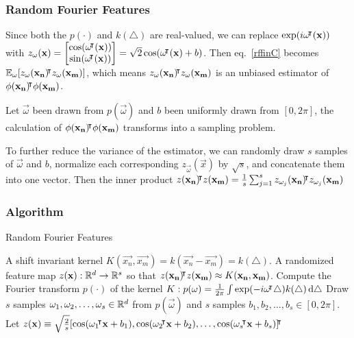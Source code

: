\documentclass[10pt]{../formats/RU}
\begin{document}
\begin{frame}
  \frametitle{Random Fourier Features}
  Since both the $p(\cdot)$ and $k(\triangle)$ are real-valued, we can replace $\exp(i\mathbf{\omega}{}^{\mkern-4mu\intercal}(\mathbf{x}))$ with
  $
  z_{\mathbf{\omega}}(\mathbf{x})=
  \begin{bmatrix}
    \cos(\mathbf{\omega}{}^{\mkern-4mu\intercal}(\mathbf{x})) \\
    \sin(\mathbf{\omega}{}^{\mkern-4mu\intercal}(\mathbf{x}))
  \end{bmatrix}
  =\sqrt{2}\cos(\mathbf{\omega}{}^{\mkern-4mu\intercal}(\mathbf{x})+b)$. Then eq.~\eqref{rffinC} becomes $\mathbb{E}_{\mathbf{\omega}}[z_{\mathbf{\omega}}(\mathbf{x_n}){}^{\mkern-4mu\intercal} z_{\mathbf{\omega}}(\mathbf{x_m})]$, which means $z_{\mathbf{\omega}}(\mathbf{x_n}){}^{\mkern-4mu\intercal} z_{\mathbf{\omega}}(\mathbf{x_m})$ is an unbiased estimator of $\phi(\mathbf{x_n}){}^{\mkern-4mu\intercal}\phi(\mathbf{x_m})$.

  Let $\vec{\omega}$ been drawn from $p(\vec{\omega})$ and $b$ been uniformly drawn from $[0, 2\pi]$, the calculation of $\phi(\mathbf{x_n}){}^{\mkern-4mu\intercal}\phi(\mathbf{x_m})$ transforms into a sampling problem.

  To further reduce the variance of the estimator, we can randomly draw $s$ samples of $\vec{\omega}$ and $b$, normalize each corresponding $z_{\vec{\omega}}(\vec{x})$ by $\sqrt{s}$, and concatenate them into one vector. Then the inner product $z(\mathbf{x_n}){}^{\mkern-4mu\intercal} z(\mathbf{x_m})=\frac{1}{s}\sum_{j=1}^{s}z_{\mathbf{\omega}_j}(\mathbf{x_n}){}^{\mkern-4mu\intercal} z_{\mathbf{\omega}_j}(\mathbf{x_m})$
\end{frame}
\begin{frame}
  \frametitle{Algorithm}
  \begin{algorithm}[H]
    \caption{Random Fourier Features}\label{RFF}
    \begin{algorithmic}
    \Require A shift invariant kernel $K(\vec{x_n}, \vec{x_m}) = k(\vec{x_n}- \vec{x_m})=k(\triangle)$.
    \Ensure A randomized feature map $z(\mathbf{x}): \mathbb{R}^d\rightarrow\mathbb{R}^s$ so that $z(\mathbf{x_n}){}^{\mkern-4mu\intercal} z(\mathbf{x_m})\approx K(\mathbf{x_n}, \mathbf{x_m})$.
    \State Compute the Fourier transform $p(\cdot)$ of the kernel $K: p(\mathbf{\omega})=\frac{1}{2\pi}\int \exp(-i\mathbf{\omega}{}^{\mkern-4mu\intercal}\triangle)k(\triangle)\mathop{}\!\mathrm{d}\triangle$
    \State Draw $s$ \iid samples $\mathbf{\omega}_1, \mathbf{\omega}_2, \ldots, \mathbf{\omega}_s \in \mathbb{R}^d$ from $p(\vec{\omega})$ and $s$ \iid samples $b_1, b_2, \ldots, b_s \in [0, 2\pi]$.
    \State Let $z(\mathbf{x})\equiv \sqrt{\frac{2}{s}}[\cos(\mathbf{\omega}_1{}^{\mkern-4mu\intercal}\mathbf{x}+b_1), \cos(\mathbf{\omega}_2{}^{\mkern-4mu\intercal}\mathbf{x}+b_2), \ldots, \cos(\mathbf{\omega}_s{}^{\mkern-4mu\intercal}\mathbf{x}+b_s)]{}^{\mkern-4mu\intercal}$
    \end{algorithmic}
  \end{algorithm}
\end{frame}
\end{document}

